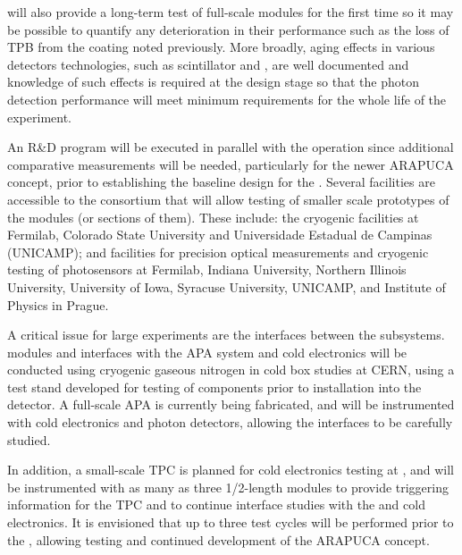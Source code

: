  will also provide a long-term test of full-scale  modules for the first time so it may be possible to quantify any deterioration in their performance such as the loss of TPB from the coating noted previously. 
More broadly, aging effects in various detectors technologies, such as scintillator and , are well documented and knowledge of such effects is required at the design stage so that the photon detection performance will meet minimum requirements for the whole life of the experiment.

An R\&D program will be executed in parallel with the  operation since additional comparative measurements will be needed, particularly for the newer ARAPUCA concept, prior to establishing the baseline design for the .
Several facilities are accessible to the consortium that will allow testing of smaller scale prototypes of the modules (or sections of them). 
These include: the cryogenic facilities 
at Fermilab,  Colorado State University and Universidade Estadual de Campinas (UNICAMP); and facilities for precision optical measurements and cryogenic testing of photosensors at Fermilab, Indiana University, Northern Illinois University, University of Iowa, Syracuse University, UNICAMP, and Institute of Physics in Prague. 


A critical issue for large experiments are the interfaces between the subsystems.  modules and interfaces with the APA system and cold electronics will be conducted using cryogenic gaseous nitrogen in cold box studies at CERN, using a test stand developed for testing of  components prior to installation into the detector.  A full-scale  APA is currently being fabricated,  
and will be instrumented with cold electronics and photon detectors, allowing the interfaces to be carefully studied.

In addition, a small-scale TPC is planned for cold electronics testing at , and will be instrumented with as many as three 1/2-length  modules to provide triggering information for the TPC and to continue interface studies with the  and cold electronics.  It is envisioned that up to three test cycles will be performed prior to the , allowing testing and continued development of the ARAPUCA concept.

